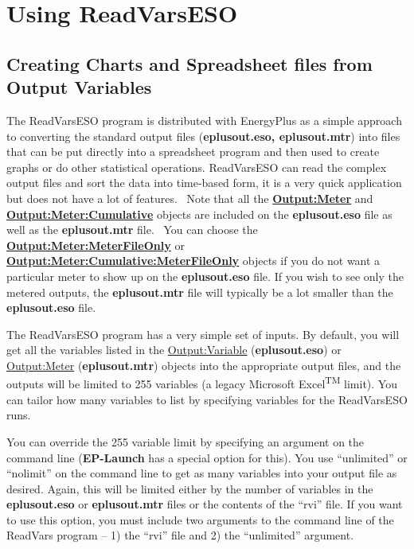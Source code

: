 \section{Using ReadVarsESO}\label{using-readvarseso}

\subsection{Creating Charts and Spreadsheet files from Output Variables}\label{creating-charts-and-spreadsheet-files-from-output-variables}

The ReadVarsESO program is distributed with EnergyPlus as a simple approach to converting the standard output files (\textbf{eplusout.eso, eplusout.mtr}) into files that can be put directly into a spreadsheet program and then used to create graphs or do other statistical operations. ReadVarsESO can read the complex output files and sort the data into time-based form, it is a very quick application but does not have a lot of features.~ Note that all the \textbf{\hyperref[outputmeter-and-outputmetermeterfileonly]{Output:Meter}} and \textbf{\hyperref[outputmetercumulative-and-outputmetercumulativemeterfileonly]{Output:Meter:Cumulative}} objects are included on the \textbf{eplusout.eso} file as well as the \textbf{eplusout.mtr} file.~ You can choose the \textbf{\hyperref[outputmeter-and-outputmetermeterfileonly]{Output:Meter:MeterFileOnly}} or \textbf{\hyperref[outputmetercumulative-and-outputmetercumulativemeterfileonly]{Output:Meter:Cumulative:MeterFileOnly}} objects if you do not want a particular meter to show up on the \textbf{eplusout.eso} file. If you wish to see only the metered outputs, the \textbf{eplusout.mtr} file will typically be a lot smaller than the \textbf{eplusout.eso} file.

The ReadVarsESO program has a very simple set of inputs. By default, you will get all the variables listed in the \hyperref[outputvariable]{Output:Variable} (\textbf{eplusout.eso}) or \hyperref[outputmeter-and-outputmetermeterfileonly]{Output:Meter} (\textbf{eplusout.mtr}) objects into the appropriate output files, and the outputs will be limited to 255 variables (a legacy Microsoft Excel\textsuperscript{TM} limit). You can tailor how many variables to list by specifying variables for the ReadVarsESO runs.

You can override the 255 variable limit by specifying an argument on the command line (\textbf{EP-Launch} has a special option for this). You use ``unlimited'' or ``nolimit'' on the command line to get as many variables into your output file as desired. Again, this will be limited either by the number of variables in the \textbf{eplusout.eso} or \textbf{eplusout.mtr} files or the contents of the ``rvi'' file. If you want to use this option, you must include two arguments to the command line of the ReadVars program -- 1) the ``rvi'' file and 2) the ``unlimited'' argument.

